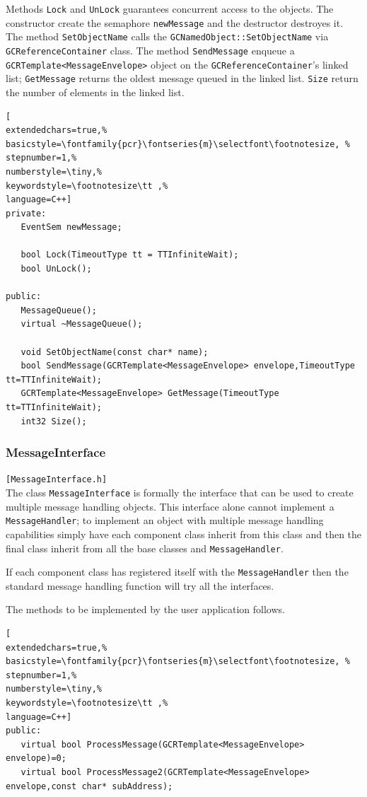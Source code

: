 Methods \texttt{Lock} and \texttt{UnLock} guarantees concurrent access to the objects. The constructor create the semaphore \texttt{newMessage} and the destructor destroyes it.
The method \texttt{SetObjectName} calls the \texttt{GCNamedObject::SetObjectName} via \texttt{GCReferenceContainer} class.
The method \texttt{SendMessage} enqueue a \texttt{GCRTemplate<MessageEnvelope>} object on the \texttt{GCReferenceContainer}'s linked list; \texttt{GetMessage} returns the oldest message queued in the linked list. \texttt{Size} return the number of elements in the linked list.
\begin{lstlisting}[
extendedchars=true,%
basicstyle=\fontfamily{pcr}\fontseries{m}\selectfont\footnotesize, %
stepnumber=1,%
numberstyle=\tiny,%
keywordstyle=\footnotesize\tt ,%
language=C++]
private:
   EventSem newMessage;

   bool Lock(TimeoutType tt = TTInfiniteWait);
   bool UnLock();

public:
   MessageQueue();
   virtual ~MessageQueue();

   void SetObjectName(const char* name);
   bool SendMessage(GCRTemplate<MessageEnvelope> envelope,TimeoutType tt=TTInfiniteWait);
   GCRTemplate<MessageEnvelope> GetMessage(TimeoutType tt=TTInfiniteWait);
   int32 Size();
\end{lstlisting}



\subsubsection{MessageInterface}
\texttt{[MessageInterface.h]}\\
The class \texttt{MessageInterface} is formally the interface that can be used to create multiple message handling objects. This interface alone cannot implement a \texttt{MessageHandler}; to implement an object with multiple message handling capabilities simply have each component class inherit from this class and then the final class inherit from all the base classes and \texttt{MessageHandler}.

If each component class has registered itself with the \texttt{MessageHandler} then the standard message handling function will try all the interfaces.

The methods to be implemented by the user application follows.

\begin{lstlisting}[
extendedchars=true,%
basicstyle=\fontfamily{pcr}\fontseries{m}\selectfont\footnotesize, %
stepnumber=1,%
numberstyle=\tiny,%
keywordstyle=\footnotesize\tt ,%
language=C++]
public:
   virtual bool ProcessMessage(GCRTemplate<MessageEnvelope> envelope)=0;
   virtual bool ProcessMessage2(GCRTemplate<MessageEnvelope> envelope,const char* subAddress);
\end{lstlisting}



